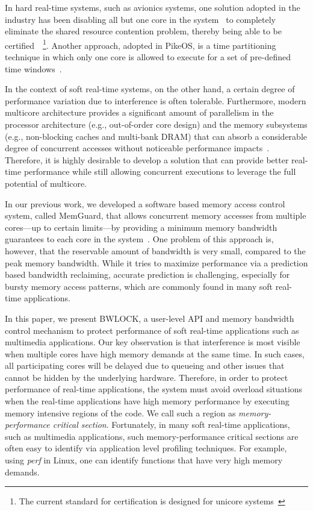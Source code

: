 \documentclass[times, 10pt,onecolumn]{article}
\begin{document}
In hard real-time systems, such as avionics systems, one solution
adopted in the industry has been disabling all but one core in the
system~\cite{kotaba2013multicore} to completely eliminate the shared
resource contention problem, thereby being able to be
certified~\cite{faa2014certification}~\footnote{The current standard
for certification is designed for unicore
systems~\cite{ARINC653}}. Another approach, adopted in PikeOS, is a
time partitioning technique in which only one core is allowed to
execute for a set of pre-defined time windows~\cite{fisher2013pikeos}.

In the context of soft real-time
systems, on the other hand, a certain degree of performance variation due to
interference is often tolerable. Furthermore, modern multicore
architecture provides a significant amount of parallelism in the
processor architecture (e.g., out-of-order core design) and the memory
subsystems (e.g., non-blocking caches and multi-bank DRAM) that can
absorb a considerable degree of concurrent accesses without noticeable
performance impacts~\cite{hennessy2011computer}. Therefore, it is
highly desirable to develop a solution that can provide better
real-time performance while still allowing concurrent
executions to leverage the full potential of multicore.

In our previous work, we developed a software based memory access
control system, called MemGuard, that allows concurrent memory accesses
from multiple cores---up to certain limits---by providing a minimum
memory bandwidth guarantees to each core in the
system~\cite{yun2013rtas}. One problem of this approach is,
however, that the reservable amount of bandwidth is very small,
compared to the peak memory bandwidth. While it tries to maximize
performance via a prediction based bandwidth reclaiming, accurate
prediction is challenging, especially for bursty memory access
patterns, which are commonly found in many soft real-time
applications.

In this paper, we present BWLOCK, a user-level API and memory
bandwidth control mechanism to protect performance of soft
real-time applications such as multimedia applications.
Our key observation is that interference is most visible when multiple
cores have high memory demands at the same time. In such cases, all
participating cores will be delayed due to queueing and other issues
that cannot be hidden by the underlying hardware. Therefore, in order
to protect performance of real-time applications, the system must
avoid overload situations when the real-time applications have high
memory performance by executing memory intensive regions of the
code. We call such a region as \emph{memory-performance critical
section}.
Fortunately, in many soft real-time applications, such as multimedia
applications, such memory-performance critical sections are often easy
to identify via application level profiling techniques. For example, using
\emph{perf} in Linux, one can identify functions that have very high
memory demands.
\end{document}
